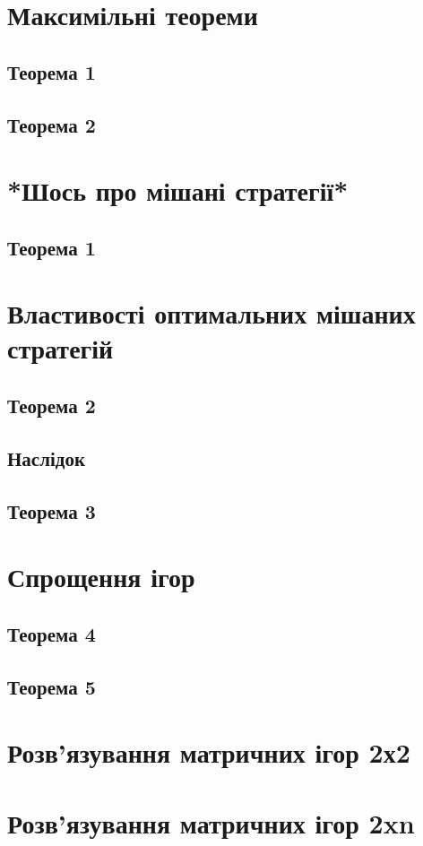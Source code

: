 \documentclass[12pt,a4paper]{book}
\begin{document}
\section{Максимільні теореми}
\subsection{Теорема 1}
\subsection{Теорема 2}
\section{*Шось про мішані стратегії*}
\subsection{Теорема 1}
\section{Властивості оптимальних мішаних стратегій}
\subsection{Теорема 2}
\subsection{Наслідок}
\subsection{Теорема 3}
\section{Спрощення ігор}
\subsection{Теорема 4}
\subsection{Теорема 5}
\section{Розв’язування матричних ігор 2х2}
\section{Розв’язування матричних ігор 2xn}
\end{document}
